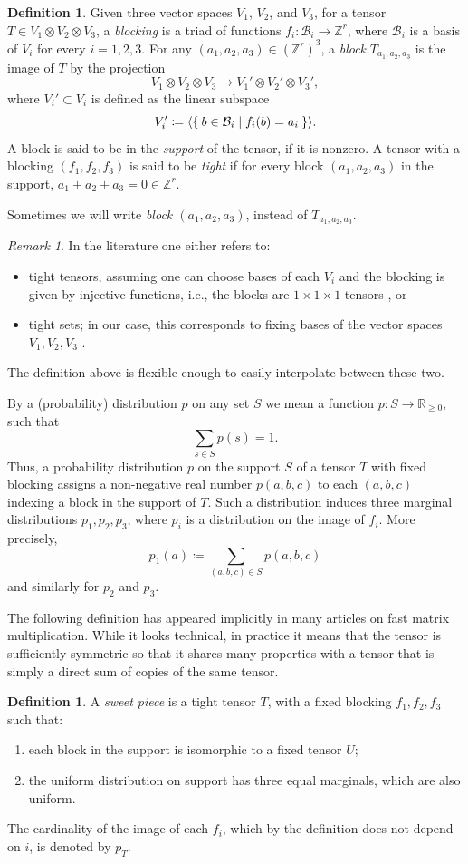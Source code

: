 \documentclass[a4paper,11pt,reqno]{amsart}
\newcommand{\calB}{\mathcal{B}}
\newcommand{\bbZ}{\mathbb{Z}}
\numberwithin{equation}{section}
\theoremstyle{definition}
\newtheorem{defn}[equation]{Definition}
\theoremstyle{plain}
\theoremstyle{remark}
\newtheorem{rem}[defn]{Remark}
\begin{document}
{
\begin{defn}
Given three vector spaces $V_1$, $V_2$, and $V_3$,
for a tensor $T\in V_1\otimes V_2\otimes V_3$,
a \emph{blocking} is a triad of functions $f_i\colon\calB_i\to \bbZ^r$, where $\calB_i$ is a basis of $V_i$ for every $i=1,2,3$.
For any $(a_1,a_2,a_3)\in (\bbZ^r)^3$, a \emph{block} $T_{a_1,a_2,a_3}$
is the image of $T$ by the projection \[V_1\otimes V_2\otimes V_3\rightarrow
V_1'\otimes V_2'\otimes V_3',\] where $V_i'\subset V_i$ is defined as the linear subspace
\[
V_i'\coloneqq \langle \Set{b\in\calB_i|f_i(b)=a_i}\rangle.
\]
A block is said to be in the \emph{support} of the tensor, if it is nonzero.
A tensor with a blocking $(f_1,f_2,f_3)$ is said to be \emph{tight} if for every block $(a_1,a_2,a_3)$ in the support, $a_1+a_2+a_3=0\in \bbZ^r$.
\end{defn}
Sometimes we will write \textit{block $(a_1,a_2,a_3)$}, instead of $T_{a_1,a_2,a_3}$.
\begin{rem}
In the literature one either refers to:
\begin{itemize}
\item tight tensors, assuming one can choose bases of each $V_i$ and the blocking is given by injective functions, i.e., the blocks are $1\times 1 \times 1$ tensors \cite{conner2021towards}, or
\item tight sets; in our case, this corresponds to fixing bases of the vector spaces $V_1,V_2,V_3$ \cite[Section 15.7]{Algebraic_Complexity_Theory}.
\end{itemize}
The definition above is flexible enough to easily interpolate between these two.
\end{rem}
By a (probability) distribution $p$ on any set $S$ we mean a function $p:S\rightarrow \mathbb{R}_{\geq 0}$, such that \[
\sum_{s\in S} p(s)=1.
\]
Thus, a probability distribution $p$ on the support $S$ of a tensor $T$ with fixed blocking assigns a non-negative real number $p(a,b,c)$ to each $(a,b,c)$ indexing a block in the support of $T$. Such a distribution induces three marginal distributions $p_1,p_2,p_3$, where $p_i$ is a distribution on the image of $f_i$. More precisely, \[p_1(a)\coloneqq\sum_{(a,b,c)\in S}p(a,b,c)\] and similarly for $p_2$ and $p_3$.
}

The following definition has appeared implicitly in many articles on fast matrix multiplication. While it looks technical, in practice it means that the tensor is sufficiently symmetric so that it shares many properties with a tensor that is simply a direct sum of copies of the same tensor.
\begin{defn}\label{def:sweet}
A \emph{sweet piece} is a tight tensor $T$, with a fixed blocking $f_1,f_2,f_3$ such that:
\begin{enumerate}[label=(\arabic*), left= 3pt, widest=2,nosep]
\item each block in the support is isomorphic to a fixed tensor $U$;
\item the uniform distribution on support has three equal marginals, which are also uniform.
\end{enumerate}
The cardinality of the image of each $f_i$, which by the definition does not depend on $i$, is denoted by $p_T$.
\end{defn}
\end{document}
